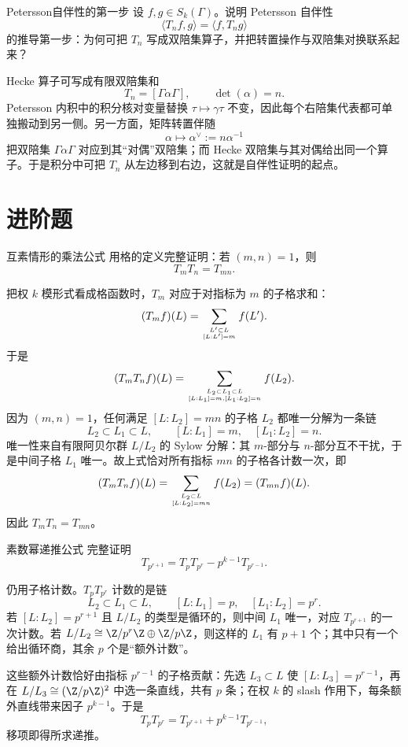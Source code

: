 \begin{problem}{Petersson自伴性的第一步}
设 $f,g\in S_k(\Gamma)$。说明 Petersson 自伴性
\[
\langle T_nf,g\rangle=\langle f,T_ng\rangle
\]
的推导第一步：为何可把 $T_n$ 写成双陪集算子，并把转置操作与双陪集对换联系起来？
\end{problem}
\begin{solution}
Hecke 算子可写成有限双陪集和
\[
T_n=[\Gamma\alpha\Gamma],\qquad \det(\alpha)=n.
\]
Petersson 内积中的积分核对变量替换 $\tau\mapsto\gamma\tau$ 不变，因此每个右陪集代表都可单独搬动到另一侧。另一方面，矩阵转置伴随
\[
\alpha\longmapsto\alpha^\vee:=n\alpha^{-1}
\]
把双陪集 $\Gamma\alpha\Gamma$ 对应到其“对偶”双陪集；而 Hecke 双陪集与其对偶给出同一个算子。于是积分中可把 $T_n$ 从左边移到右边，这就是自伴性证明的起点。
\end{solution}

\section{进阶题 \medium}

\begin{problem}{互素情形的乘法公式}
用格的定义完整证明：若 $(m,n)=1$，则
\[
T_mT_n=T_{mn}.
\]
\end{problem}
\begin{solution}
把权 $k$ 模形式看成格函数时，$T_m$ 对应于对指标为 $m$ 的子格求和：
\[
(T_mf)(L)=\sum_{L'\subset L\atop [L:L']=m}f(L').
\]
于是
\[
(T_mT_nf)(L)=\sum_{L_2\subset L_1\subset L\atop [L:L_1]=m,[L_1:L_2]=n}f(L_2).
\]
因为 $(m,n)=1$，任何满足 $[L:L_2]=mn$ 的子格 $L_2$ 都唯一分解为一条链
\[
L_2\subset L_1\subset L,
\qquad [L:L_1]=m,
\quad [L_1:L_2]=n.
\]
唯一性来自有限阿贝尔群 $L/L_2$ 的 Sylow 分解：其 $m$-部分与 $n$-部分互不干扰，于是中间子格 $L_1$ 唯一。故上式恰对所有指标 $mn$ 的子格各计数一次，即
\[
(T_mT_nf)(L)=\sum_{L_2\subset L\atop [L:L_2]=mn}f(L_2)=(T_{mn}f)(L).
\]
因此 $T_mT_n=T_{mn}$。
\end{solution}

\begin{problem}{素数幂递推公式}
完整证明
\[
T_{p^{r+1}}=T_pT_{p^r}-p^{k-1}T_{p^{r-1}}.
\]
\end{problem}
\begin{solution}
仍用子格计数。$T_pT_{p^r}$ 计数的是链
\[
L_2\subset L_1\subset L,
\qquad [L:L_1]=p,
\quad [L_1:L_2]=p^r.
\]
若 $[L:L_2]=p^{r+1}$ 且 $L/L_2$ 的类型是循环的，则中间 $L_1$ 唯一，对应 $T_{p^{r+1}}$ 的一次计数。若 $L/L_2\cong \Z/p^r\Z\oplus\Z/p\Z$，则这样的 $L_1$ 有 $p+1$ 个；其中只有一个给出循环商，其余 $p$ 个是“额外计数”。

这些额外计数恰好由指标 $p^{r-1}$ 的子格贡献：先选 $L_3\subset L$ 使 $[L:L_3]=p^{r-1}$，再在 $L/L_3\cong (\Z/p\Z)^2$ 中选一条直线，共有 $p$ 条；在权 $k$ 的 slash 作用下，每条额外直线带来因子 $p^{k-1}$。于是
\[
T_pT_{p^r}=T_{p^{r+1}}+p^{k-1}T_{p^{r-1}},
\]
移项即得所求递推。
\end{solution}

